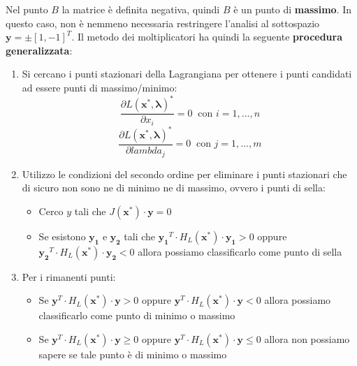 \documentclass[12pt]{article}
\begin{document}
Nel punto $B$ la matrice è definita negativa, quindi $B$ è un punto di \textbf{massimo}. \newline
In questo caso, non è nemmeno necessaria restringere l'analisi al sottospazio $\boldsymbol{y} = \pm[1, -1]^T$. \newline
Il metodo dei moltiplicatori ha quindi la seguente \textbf{procedura generalizzata}:
\begin{enumerate}
    \item Si cercano i punti stazionari della Lagrangiana per ottenere i punti candidati ad essere punti di massimo/minimo: $$\frac{\partial L(\boldsymbol{x}^*, \boldsymbol{\lambda})^*}{\partial x_i} = 0 \; \; \textrm{con } i = 1,...,n$$ $$\frac{\partial L(\boldsymbol{x}^*, \boldsymbol{\lambda})^*}{\partial lambda_j} = 0 \; \; \textrm{con } j = 1,...,m$$
    \item Utilizzo le condizioni del secondo ordine per eliminare i punti stazionari che di sicuro non sono ne di minimo ne di massimo, ovvero i punti di sella:
    \begin{itemize}
        \item Cerco $y$ tali che $J(\boldsymbol{x}^*)\cdot \boldsymbol{y} = 0$
        \item Se esistono $\boldsymbol{y_1}$ e $\boldsymbol{y_2}$ tali che $\boldsymbol{y_1}^T \cdot H_L(\boldsymbol{x}^*) \cdot \boldsymbol{y_1} > 0$ oppure $\boldsymbol{y_2}^T \cdot H_L(\boldsymbol{x}^*) \cdot \boldsymbol{y_2} < 0$ allora possiamo classificarlo come punto di sella 
    \end{itemize}
    \item Per i rimanenti punti:
    \begin{itemize}
        \item Se $\boldsymbol{y}^T \cdot H_L(\boldsymbol{x}^*) \cdot \boldsymbol{y} > 0$ oppure $\boldsymbol{y}^T \cdot H_L(\boldsymbol{x}^*) \cdot \boldsymbol{y} < 0$ allora possiamo classificarlo come punto di minimo o massimo
        \item Se $\boldsymbol{y}^T \cdot H_L(\boldsymbol{x}^*) \cdot \boldsymbol{y} \geq 0$ oppure $\boldsymbol{y}^T \cdot H_L(\boldsymbol{x}^*) \cdot \boldsymbol{y} \leq 0$ allora non possiamo sapere se tale punto è di minimo o massimo
    \end{itemize}
\end{enumerate}
\end{document}

